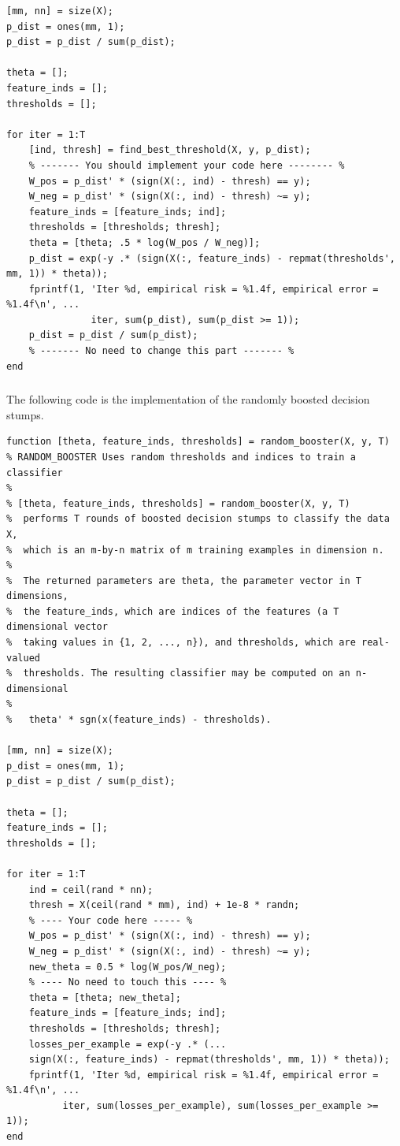 \documentclass[11pt,a4paper,titlepage]{article}
\begin{document}
{{{\begin{verbatim}
[mm, nn] = size(X);
p_dist = ones(mm, 1);
p_dist = p_dist / sum(p_dist);

theta = [];
feature_inds = [];
thresholds = [];

for iter = 1:T
    [ind, thresh] = find_best_threshold(X, y, p_dist);
    % ------- You should implement your code here -------- %
    W_pos = p_dist' * (sign(X(:, ind) - thresh) == y);
    W_neg = p_dist' * (sign(X(:, ind) - thresh) ~= y);
    feature_inds = [feature_inds; ind];
    thresholds = [thresholds; thresh];
    theta = [theta; .5 * log(W_pos / W_neg)];
    p_dist = exp(-y .* (sign(X(:, feature_inds) - repmat(thresholds', mm, 1)) * theta));
    fprintf(1, 'Iter %d, empirical risk = %1.4f, empirical error = %1.4f\n', ...
               iter, sum(p_dist), sum(p_dist >= 1));
    p_dist = p_dist / sum(p_dist);
    % ------- No need to change this part ------- %
end
\end{verbatim}
}\label{prob:6d2}
\subsubsection{}{
\quad The following code is the implementation of the randomly boosted decision stumps.
\begin{verbatim}
function [theta, feature_inds, thresholds] = random_booster(X, y, T)
% RANDOM_BOOSTER Uses random thresholds and indices to train a classifier
%
% [theta, feature_inds, thresholds] = random_booster(X, y, T)
%  performs T rounds of boosted decision stumps to classify the data X,
%  which is an m-by-n matrix of m training examples in dimension n.
%
%  The returned parameters are theta, the parameter vector in T dimensions,
%  the feature_inds, which are indices of the features (a T dimensional vector
%  taking values in {1, 2, ..., n}), and thresholds, which are real-valued
%  thresholds. The resulting classifier may be computed on an n-dimensional
%
%   theta' * sgn(x(feature_inds) - thresholds).

[mm, nn] = size(X);
p_dist = ones(mm, 1);
p_dist = p_dist / sum(p_dist);

theta = [];
feature_inds = [];
thresholds = [];

for iter = 1:T
    ind = ceil(rand * nn);
    thresh = X(ceil(rand * mm), ind) + 1e-8 * randn;
    % ---- Your code here ----- %
    W_pos = p_dist' * (sign(X(:, ind) - thresh) == y);
    W_neg = p_dist' * (sign(X(:, ind) - thresh) ~= y);
    new_theta = 0.5 * log(W_pos/W_neg);
    % ---- No need to touch this ---- %
    theta = [theta; new_theta];
    feature_inds = [feature_inds; ind];
    thresholds = [thresholds; thresh];
    losses_per_example = exp(-y .* (...
    sign(X(:, feature_inds) - repmat(thresholds', mm, 1)) * theta));
    fprintf(1, 'Iter %d, empirical risk = %1.4f, empirical error = %1.4f\n', ...
          iter, sum(losses_per_example), sum(losses_per_example >= 1));
end
\end{verbatim}
}\label{prob:6d3}
}}
\end{document}
